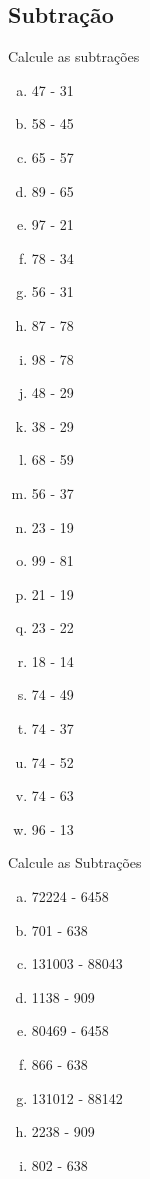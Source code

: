 \subsection{Subtração}

\item Calcule as subtrações
\begin{multicols}{3}
\begin{enumerate}[a)]
	\item 47 - 31
	\item 58 - 45
	\item 65 - 57
	\item 89 - 65
	\item 97 - 21
	\item 78 - 34
	\item 56 - 31
	\item 87 - 78
	\item 98 - 78
	\item 48 - 29
	\item 38 - 29
	\item 68 - 59
	\item 56 - 37
	\item 23 - 19
	\item 99 - 81
	\item 21 - 19
	\item 23 - 22
	\item 18 - 14
	\item 74 - 49
	\item 74 - 37
	\item 74 - 52
	\item 74 - 63
	\item 96 - 13
	 
\end{enumerate}
\end{multicols}

\item Calcule as Subtrações
\begin{multicols}{3}
\begin{enumerate}[a)]
	\item 72224 - 6458
	\item 701 - 638
	\item 131003 - 88043
	\item 1138 - 909
	\item 80469 - 6458
	\item 866 - 638
	\item 131012 - 88142
	\item 2238 - 909
	\item 802 - 638
\end{enumerate}
\end{multicols}

